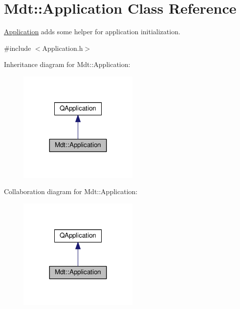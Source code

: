 \hypertarget{class_mdt_1_1_application}{}\section{Mdt\+:\+:Application Class Reference}
\label{class_mdt_1_1_application}


\hyperlink{class_mdt_1_1_application}{Application} adds some helper for application initialization.  




{\ttfamily \#include $<$Application.\+h$>$}



Inheritance diagram for Mdt\+:\+:Application\+:
\nopagebreak
\begin{figure}[H]
\begin{center}
\leavevmode
\includegraphics[width=167pt]{class_mdt_1_1_application__inherit__graph}
\end{center}
\end{figure}


Collaboration diagram for Mdt\+:\+:Application\+:
\nopagebreak
\begin{figure}[H]
\begin{center}
\leavevmode
\includegraphics[width=167pt]{class_mdt_1_1_application__coll__graph}
\end{center}
\end{figure}
